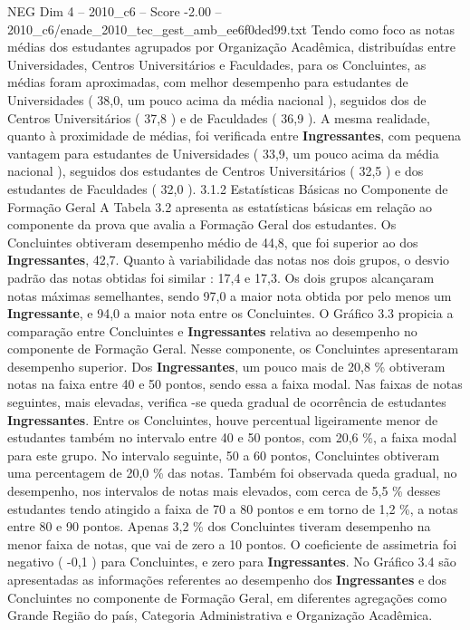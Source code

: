 \begin{textsample}{NEG Dim 4 – 2010\_c6 – Score -2.00 – 2010\_c6/enade\_2010\_tec\_gest\_amb\_ee6f0ded99.txt}
Tendo como foco as notas médias dos estudantes agrupados por Organização Acadêmica, distribuídas entre Universidades, Centros Universitários e Faculdades, para os Concluintes, as médias foram aproximadas, com melhor desempenho para estudantes de Universidades ( 38,0, um pouco acima da média nacional ), seguidos dos de Centros Universitários ( 37,8 ) e de Faculdades ( 36,9 ).
A mesma realidade, quanto à proximidade de médias, foi verificada entre \textbf{Ingressantes}, com pequena vantagem para estudantes de Universidades ( 33,9, um pouco acima da média nacional ), seguidos dos estudantes de Centros Universitários ( 32,5 ) e dos estudantes de Faculdades ( 32,0 ). 3.1.2 Estatísticas Básicas no Componente de Formação Geral A Tabela 3.2 apresenta as estatísticas básicas em relação ao componente da prova que avalia a Formação Geral dos estudantes.
Os Concluintes obtiveram desempenho médio de 44,8, que foi superior ao dos \textbf{Ingressantes}, 42,7.
Quanto à variabilidade das notas nos dois grupos, o desvio padrão das notas obtidas foi similar : 17,4 e 17,3.
Os dois grupos alcançaram notas máximas semelhantes, sendo 97,0 a maior nota obtida por pelo menos um \textbf{Ingressante}, e 94,0 a maior nota entre os Concluintes.
O Gráfico 3.3 propicia a comparação entre Concluintes e \textbf{Ingressantes} relativa ao desempenho no componente de Formação Geral.
Nesse componente, os Concluintes apresentaram desempenho superior.
Dos \textbf{Ingressantes}, um pouco mais de 20,8 \% obtiveram notas na faixa entre 40 e 50 pontos, sendo essa a faixa modal.
Nas faixas de notas seguintes, mais elevadas, verifica -se queda gradual de ocorrência de estudantes \textbf{Ingressantes}.
Entre os Concluintes, houve percentual ligeiramente menor de estudantes também no intervalo entre 40 e 50 pontos, com 20,6 \%, a faixa modal para este grupo.
No intervalo seguinte, 50 a 60 pontos, Concluintes obtiveram uma percentagem de 20,0 \% das notas.
Também foi observada queda gradual, no desempenho, nos intervalos de notas mais elevados, com cerca de 5,5 \% desses estudantes tendo atingido a faixa de 70 a 80 pontos e em torno de 1,2 \%, a notas entre 80 e 90 pontos.
Apenas 3,2 \% dos Concluintes tiveram desempenho na menor faixa de notas, que vai de zero a 10 pontos.
O coeficiente de assimetria foi negativo ( -0,1 ) para Concluintes, e zero para \textbf{Ingressantes}.
No Gráfico 3.4 são apresentadas as informações referentes ao desempenho dos \textbf{Ingressantes} e dos Concluintes no componente de Formação Geral, em diferentes agregações como Grande Região do país, Categoria Administrativa e Organização Acadêmica.

\end{textsample}
